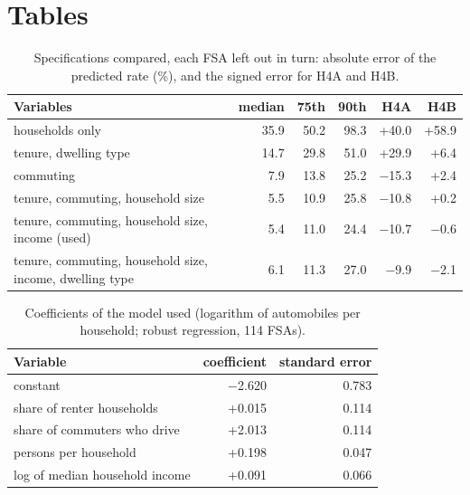 \documentclass[11pt,a4paper]{article}
\begin{document}
\appendix
\section{Tables}
\begin{table}[H]\centering\small
\caption{Specifications compared, each FSA left out in turn: absolute error of the predicted rate (\%), and the signed error for H4A and H4B.}\label{tab:spec}
\begin{tabular}{@{}p{7.4cm}rrrrr@{}}\toprule
Variables & median & 75th & 90th & H4A & H4B \\\midrule
households only & 35.9 & 50.2 & 98.3 & +40.0 & +58.9 \\
tenure, dwelling type & 14.7 & 29.8 & 51.0 & +29.9 & +6.4 \\
commuting & 7.9 & 13.8 & 25.2 & $-$15.3 & +2.4 \\
tenure, commuting, household size & 5.5 & 10.9 & 25.8 & $-$10.8 & +0.2 \\
tenure, commuting, household size, income (used) & 5.4 & 11.0 & 24.4 & $-$10.7 & $-$0.6 \\
tenure, commuting, household size, income, dwelling type & 6.1 & 11.3 & 27.0 & $-$9.9 & $-$2.1 \\
\bottomrule\end{tabular}\end{table}
\begin{table}[H]\centering\small
\caption{Coefficients of the model used (logarithm of automobiles per household; robust regression, 114 FSAs).}
\begin{tabular}{@{}lrr@{}}\toprule
Variable & coefficient & standard error \\\midrule
constant & $-$2.620 & 0.783 \\
share of renter households & +0.015 & 0.114 \\
share of commuters who drive & +2.013 & 0.114 \\
persons per household & +0.198 & 0.047 \\
log of median household income & +0.091 & 0.066 \\
\bottomrule\end{tabular}\end{table}
\end{document}
